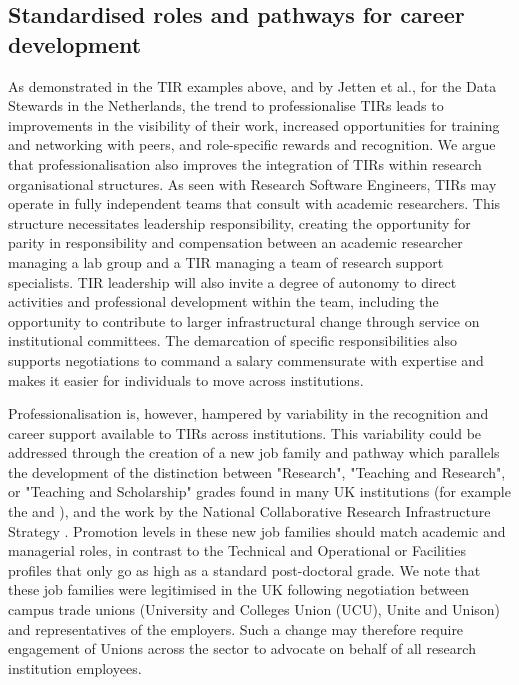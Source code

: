 \documentclass[authordate,meta,issue]{jote-new-article}
\begin{document}
\subsection{Standardised roles and pathways for career development}



As demonstrated in the TIR examples above, and by Jetten et al., \parencites{Jetten2021} for the Data Stewards in the Netherlands, the trend to professionalise TIRs leads to improvements in the visibility of their work, increased opportunities for training and networking with peers, and role-specific rewards and recognition. We argue that professionalisation also improves the integration of TIRs within research organisational structures. As seen with Research Software Engineers, TIRs may operate in fully independent teams that consult with academic researchers. This structure necessitates leadership responsibility, creating the opportunity for parity in responsibility and compensation between an academic researcher managing a lab group and a TIR managing a team of research support specialists. TIR leadership will also invite a degree of autonomy to direct activities and professional development within the team, including the opportunity to contribute to larger infrastructural change through service on institutional committees. The demarcation of specific responsibilities also supports negotiations to command a salary commensurate with expertise and makes it easier for individuals to move across institutions.







Professionalisation is, however, hampered by variability in the recognition and career support available to TIRs across institutions. This variability could be addressed through the creation of a new job family and pathway which parallels the development of the distinction between "Research", "Teaching and Research", or "Teaching and Scholarship" grades found in many UK institutions (for example the \textcites{Universitysussex_academic_2019} and \textcites{UniversityofStAndrews2015}), and the work by the National Collaborative Research Infrastructure Strategy \parencites{NCRIS2022}. Promotion levels in these new job families should match academic and managerial roles, in contrast to the Technical and Operational or Facilities profiles that only go as high as a standard post-doctoral grade. We note that these job families were legitimised in the UK following negotiation between campus trade unions (University and Colleges Union (UCU), Unite and Unison) and representatives of the employers. Such a change may therefore require engagement of Unions across the sector to advocate on behalf of all research institution employees.
\end{document}
